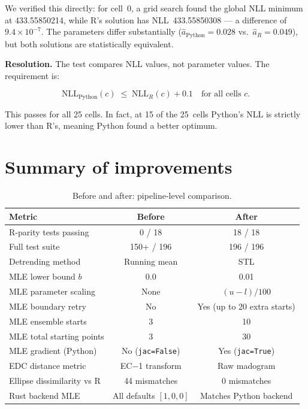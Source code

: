 \documentclass[12pt,a4paper]{article}
\begin{document}
We verified this directly: for cell~0, a grid search found the
global NLL minimum at 433.55850214, while R's solution has
NLL~433.55850308 --- a difference of $9.4 \times 10^{-7}$.
The parameters differ substantially
($\hat{a}_{\text{Python}} = 0.028$ vs.\ $\hat{a}_R = 0.049$),
but both solutions are statistically equivalent.

\textbf{Resolution.}
The test compares NLL values, not parameter values.  The
requirement is:

$$
  \text{NLL}_{\text{Python}}(c) \;\leq\;
  \text{NLL}_R(c) + 0.1
  \quad \text{for all cells } c.
$$

This passes for all 25 cells.  In fact, at 15 of the 25~cells
Python's NLL is strictly lower than R's, meaning Python found a
better optimum.

\section{Summary of improvements}

\begin{table}[h]
\centering
\caption{Before and after: pipeline-level comparison.}
\label{tab:summary}
\begin{tabular}{lcc}
\toprule
\textbf{Metric} & \textbf{Before} & \textbf{After} \\
\midrule
R-parity tests passing & 0 / 18 & 18 / 18 \\
Full test suite & 150+ / 196 & 196 / 196 \\
Detrending method & Running mean & STL \\
MLE lower bound $b$ & 0.0 & 0.01 \\
MLE parameter scaling & None & $(u - l) / 100$ \\
MLE boundary retry & No & Yes (up to 20 extra starts) \\
MLE ensemble starts & 3 & 10 \\
MLE total starting points & 3 & 30 \\
MLE gradient (Python) & No (\texttt{jac=False}) & Yes (\texttt{jac=True}) \\
EDC distance metric & EC$-$1 transform & Raw madogram \\
Ellipse dissimilarity vs R & 44 mismatches & 0 mismatches \\
Rust backend MLE & All defaults $[1,0,0]$ & Matches Python backend \\
\bottomrule
\end{tabular}
\end{table}
\end{document}

